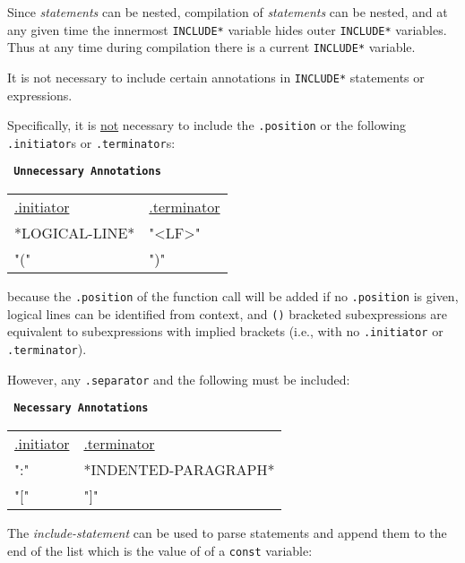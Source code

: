 \documentclass[12pt]{article}
\begin{document}
Since {\em statements} can be nested, compilation of {\em statements}
can be nested, and at any given time the innermost {\tt *INCLUDE*}
variable hides outer {\tt *INCLUDE*} variables.  Thus at any time
during compilation there is a current {\tt *INCLUDE*} variable.

It is not necessary to include certain annotations
in {\tt *INCLUDE*} statements or expressions.

Specifically, it is \underline{not} necessary to
include the {\tt .position} or
the following {\tt .initiator}s or {\tt .terminator}s:

\begin{center} \tt
{\rm \bf Unnecessary Annotations}\label{UNNECESSARY-ANNOTATIONS}
\\[1ex]
\begin{tabular}{l@{~~~~~~~~~~}l}
\underline{.initiator} & \underline{.terminator}
\\[1ex]
*LOGICAL-LINE* & "<LF>" \\
"(" & ")" \\
\end{tabular}
\end{center}

because the {\tt .position} of the function call will be added
if no {\tt .position} is given,
logical lines can be identified from context, and
{\tt ()} bracketed subexpressions are equivalent to
subexpressions with implied brackets (i.e., with no
{\tt .initiator} or {\tt .terminator}).

However, any {\tt .separator} and the following must be included:

\begin{center} \tt
{\rm \bf Necessary Annotations}
\\[1ex]
\begin{tabular}{l@{~~~~~~~~~~}l}
\underline{.initiator} & \underline{.terminator}
\\[1ex]
":" & *INDENTED-PARAGRAPH* \\
"[" & "]" \\
\end{tabular}
\end{center}


The {\em include-statement} can be used to parse statements
and append them to the end of the list which is the value of
of a {\tt const} variable:
\end{document}
